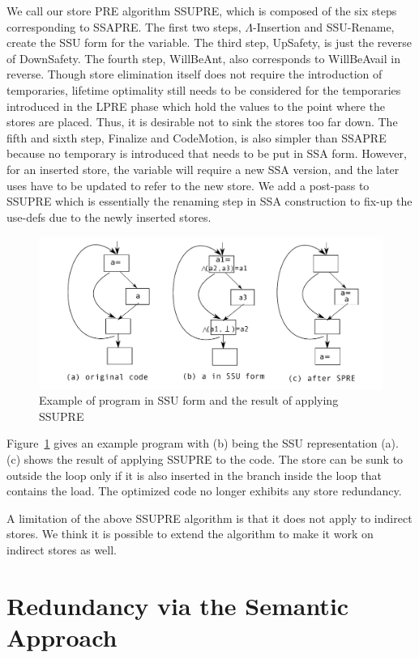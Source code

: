 We call our store PRE algorithm SSUPRE, which is composed of the six steps
corresponding to SSAPRE.  The first two steps, $\Lambda$-Insertion and
SSU-Rename, create the SSU form for the variable.  The third step, UpSafety,
is just the reverse of DownSafety.  The fourth step, WillBeAnt, also corresponds
to WillBeAvail in reverse.  Though store elimination itself does not require
the introduction of temporaries, lifetime optimality still needs to be
considered for the temporaries introduced in the LPRE phase which hold the 
values to the point where the stores are placed.  Thus, it is desirable not 
to sink the stores too far down.  
The fifth and sixth step, Finalize and CodeMotion, is also simpler than 
SSAPRE because no temporary is introduced that needs to be put in SSA form.
However, for an inserted store, the variable will require a new SSA version,
and the later uses have to be updated to refer to the new store.
We add a post-pass to SSUPRE which is essentially the renaming step in SSA
construction to fix-up the use-defs due to the newly inserted stores.

\begin{figure}
\centering
\includegraphics[scale=0.55]{fig-ssupre.pdf}
\caption{Example of program in SSU form and the result of applying SSUPRE}
\label{fig: ssupre}
\end{figure}

Figure~\ref{fig: ssupre} gives an example program with (b) being the SSU 
representation (a).  (c) shows the result of applying SSUPRE to the code.
The store can be sunk to outside the loop only if it is also inserted in
the branch inside the loop that contains the load.  The optimized code no
longer exhibits any store redundancy.

A limitation of the above SSUPRE algorithm is that it does not apply to 
indirect stores.  We think it is possible to extend the algorithm to make it
work on indirect stores as well.

\section{Redundancy via the Semantic Approach}
\label{section:Part3:Pre_not_helped:SemanticPRE}

